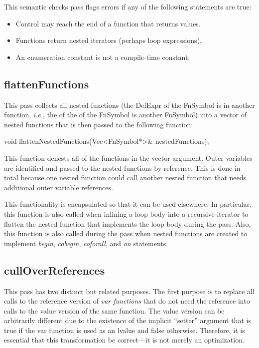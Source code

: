 \documentclass[10pt]{article}
\newcommand{\ie}{\emph{i.e.}}
\begin{document}
This semantic checks pass flags errors if any of the following
statements are true:
\begin{itemize}
\item Control may reach the end of a function that returns values.
\item Functions return nested iterators (perhaps loop expressions).
\item An enumeration constant is not a compile-time constant.
\end{itemize}

\subsection{flattenFunctions}
\label{sec:flattenFunctions}

This pass collects all nested functions (the DefExpr of the FnSymbol
is in another function, \ie, the  of the
 of the FnSymbol is another FnSymbol) into a vector of
nested functions that is then passed to the following function:

\begin{clang}
void flattenNestedFunctions(Vec<FnSymbol*>& nestedFunctions);
\end{clang}

This function denests all of the functions in the vector argument.
Outer variables are identified and passed to the nested functions by
reference.  This is done in total because one nested function could
call another nested function that needs additional outer variable
references.

This functionality is encapsulated so that it can be used elsewhere.
In particular, this function is also called when inlining a loop body
into a recursive iterator to flatten the nested function that
implements the loop body during the  pass.  Also,
this function is also called during the  pass when nested
functions are created to implement \emph{begin}, \emph{cobegin},
\emph{coforall}, and \emph{on} statements.

\subsection{cullOverReferences}

This pass has two distinct but related purposes.  The first purpose is
to replace all calls to the reference version of \emph{var functions}
that do not need the reference into calls to the value version of the
same function.  The value version can be arbitrarily different due to
the existence of the implicit ``setter'' argument that is true if the
var function is used as an lvalue and false otherwise.  Therefore, it
is essential that this transformation be correct---it is not merely an
optimization.
\end{document}
